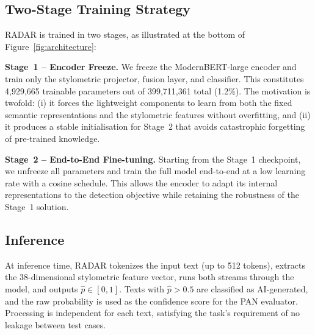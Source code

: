 \subsection{Two-Stage Training Strategy}

RADAR is trained in two stages, as illustrated at the bottom of Figure~\ref{fig:architecture}:

\textbf{Stage~1 -- Encoder Freeze.} We freeze the ModernBERT-large encoder and train only the stylometric projector, fusion layer, and classifier. This constitutes 4,929,665 trainable parameters out of 399,711,361 total (1.2\%). The motivation is twofold: (i) it forces the lightweight components to learn from both the fixed semantic representations and the stylometric features without overfitting, and (ii) it produces a stable initialisation for Stage~2 that avoids catastrophic forgetting of pre-trained knowledge.

\textbf{Stage~2 -- End-to-End Fine-tuning.} Starting from the Stage~1 checkpoint, we unfreeze all parameters and train the full model end-to-end at a low learning rate with a cosine schedule. This allows the encoder to adapt its internal representations to the detection objective while retaining the robustness of the Stage~1 solution.

\subsection{Inference}

At inference time, RADAR tokenizes the input text (up to 512 tokens), extracts the 38-dimensional stylometric feature vector, runs both streams through the model, and outputs $\hat{p} \in [0,1]$. Texts with $\hat{p} > 0.5$ are classified as AI-generated, and the raw probability is used as the confidence score for the PAN evaluator. Processing is independent for each text, satisfying the task's requirement of no leakage between test cases.

